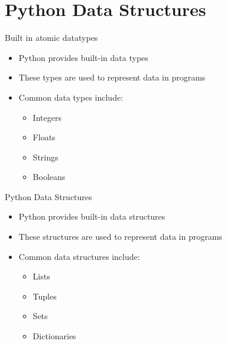 \documentclass{beamer}
\begin{document}
\section{Python Data Structures}
\begin{frame}{Built in atomic datatypes}
    \begin{itemize}
        \item Python provides built-in data types
        \item These types are used to represent data in programs
        \item Common data types include:
        \begin{itemize}
            \item Integers
            \item Floats
            \item Strings
            \item Booleans
        \end{itemize}
    \end{itemize}

\end{frame}

    

\begin{frame}{Python Data Structures}
    \begin{itemize}
        \item Python provides built-in data structures
        \item These structures are used to represent data in programs
        \item Common data structures include:
        \begin{itemize}
            \item Lists
            \item Tuples
            \item Sets
            \item Dictionaries
        \end{itemize}
    \end{itemize}
\end{frame}
\end{document}
